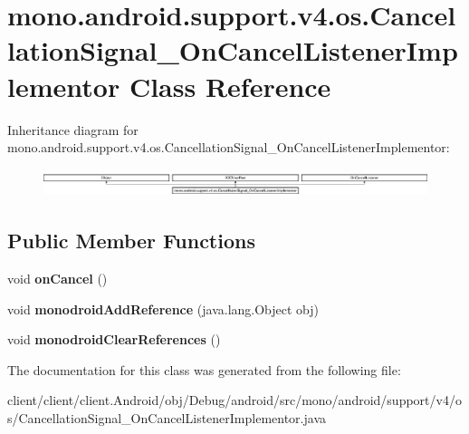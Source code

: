 \hypertarget{classmono_1_1android_1_1support_1_1v4_1_1os_1_1CancellationSignal__OnCancelListenerImplementor}{}\section{mono.\+android.\+support.\+v4.\+os.\+Cancellation\+Signal\+\_\+\+On\+Cancel\+Listener\+Implementor Class Reference}
\label{classmono_1_1android_1_1support_1_1v4_1_1os_1_1CancellationSignal__OnCancelListenerImplementor}
Inheritance diagram for mono.\+android.\+support.\+v4.\+os.\+Cancellation\+Signal\+\_\+\+On\+Cancel\+Listener\+Implementor\+:\begin{figure}[H]
\begin{center}
\leavevmode
\includegraphics[height=0.806336cm]{classmono_1_1android_1_1support_1_1v4_1_1os_1_1CancellationSignal__OnCancelListenerImplementor}
\end{center}
\end{figure}
\subsection*{Public Member Functions}
\begin{DoxyCompactItemize}
\item 
\hypertarget{classmono_1_1android_1_1support_1_1v4_1_1os_1_1CancellationSignal__OnCancelListenerImplementor_a14a9b4bed965f010e2120c2eb10e68af}{}void {\bfseries on\+Cancel} ()\label{classmono_1_1android_1_1support_1_1v4_1_1os_1_1CancellationSignal__OnCancelListenerImplementor_a14a9b4bed965f010e2120c2eb10e68af}

\item 
\hypertarget{classmono_1_1android_1_1support_1_1v4_1_1os_1_1CancellationSignal__OnCancelListenerImplementor_a1d777c1a6c121dac15f3b673e277fc82}{}void {\bfseries monodroid\+Add\+Reference} (java.\+lang.\+Object obj)\label{classmono_1_1android_1_1support_1_1v4_1_1os_1_1CancellationSignal__OnCancelListenerImplementor_a1d777c1a6c121dac15f3b673e277fc82}

\item 
\hypertarget{classmono_1_1android_1_1support_1_1v4_1_1os_1_1CancellationSignal__OnCancelListenerImplementor_a2f6d27789484ee49837d8ebf4dd88e5e}{}void {\bfseries monodroid\+Clear\+References} ()\label{classmono_1_1android_1_1support_1_1v4_1_1os_1_1CancellationSignal__OnCancelListenerImplementor_a2f6d27789484ee49837d8ebf4dd88e5e}

\end{DoxyCompactItemize}


The documentation for this class was generated from the following file\+:\begin{DoxyCompactItemize}
\item 
client/client/client.\+Android/obj/\+Debug/android/src/mono/android/support/v4/os/Cancellation\+Signal\+\_\+\+On\+Cancel\+Listener\+Implementor.\+java\end{DoxyCompactItemize}

